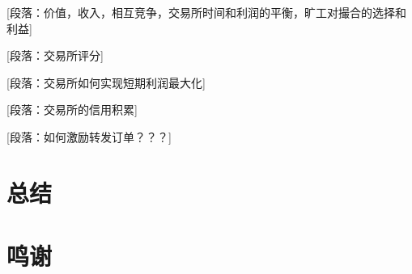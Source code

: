 \documentclass[UTF8,nofonts]{ctexart}
\begin{document}
[段落：价值，收入，相互竞争，交易所时间和利润的平衡，旷工对撮合的选择和利益]

[段落：交易所评分]

[段落：交易所如何实现短期利润最大化]

[段落：交易所的信用积累]



[段落：如何激励转发订单？？？]



\section{总结\label{sec:summary}}

\section{鸣谢\label{sec:acknowledgement}}

\newpage


\end{document}
